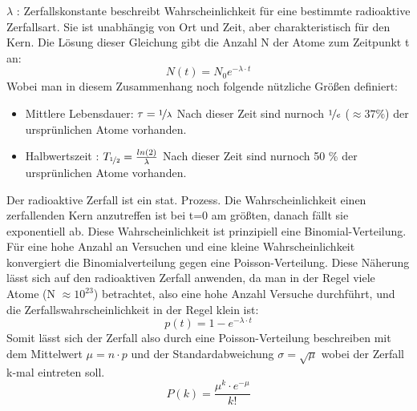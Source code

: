 \documentclass[Ex4_Zusammenfassung.tex]{subfiles}
\begin{document}
\begin{itemize}
$ \lambda $ : Zerfallskonstante beschreibt Wahrscheinlichkeit für eine bestimmte radioaktive Zerfallsart. Sie ist unabhängig von Ort und Zeit, aber charakteristisch für den Kern. \newline
Die Lösung dieser Gleichung gibt die Anzahl N der Atome zum Zeitpunkt t an: 
\begin{equation}
N(t) = N_{0} e^{-\lambda \cdot t}
\end{equation}  \newpage
Wobei man in diesem Zusammenhang noch folgende nützliche Größen definiert: 
\begin{itemize}
\item Mittlere Lebensdauer: $ \tau = \nicefrac{1}{\lambda} $ \newline 
Nach dieser Zeit sind nurnoch $\nicefrac{1}{e} $ ($ \approx 37 \% $) der ursprünlichen Atome vorhanden.
\item Halbwertszeit : $ T_{\nicefrac{1}{2}} = \frac{ln(2)}{\lambda} $
Nach dieser Zeit sind nurnoch 50 \% der ursprünlichen Atome vorhanden.
\end{itemize}
\end{itemize}
Der radioaktive Zerfall ist ein stat. Prozess. Die Wahrscheinlichkeit einen zerfallenden Kern anzutreffen ist bei t=0 am größten, danach fällt sie exponentiell ab. 
Diese Wahrscheinlichkeit ist prinzipiell eine Binomial-Verteilung. Für eine hohe Anzahl an Versuchen und eine kleine Wahrscheinlichkeit konvergiert die Binomialverteilung gegen eine Poisson-Verteilung. Diese Näherung lässt sich auf den radioaktiven Zerfall anwenden, da man in der Regel viele Atome (N $\approx 10^{23} $) betrachtet, also eine hohe Anzahl Versuche durchführt, und die Zerfallswahrscheinlichkeit in der Regel klein ist: 
\begin{equation}
p(t) = 1 - e^{-\lambda \cdot t} 
\end{equation}
Somit lässt sich der Zerfall also durch eine Poisson-Verteilung beschreiben mit dem Mittelwert $ \mu = n\cdot p $ und der Standardabweichung  $ \sigma = \sqrt{\mu} $ wobei der Zerfall k-mal eintreten soll. 
\begin{equation}
P(k) = \frac{\mu^k \cdot e^{-\mu} } {k!} 
\end{equation}
\end{document}
